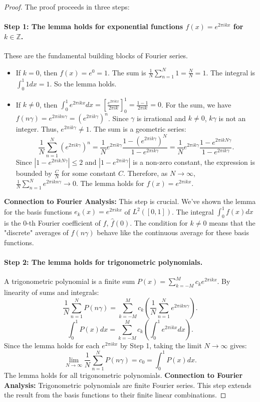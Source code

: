 \documentclass[12pt]{article}
\newcommand{\Z}{\mathbb{Z}}
\begin{document}
\begin{proof}
The proof proceeds in three steps:
\paragraph{Step 1: The lemma holds for exponential functions $f(x) = e^{2\pi i k x}$ for $k \in \Z$.}
These are the fundamental building blocks of Fourier series.
\begin{itemize}
    \item If $k=0$, then $f(x) = e^0 = 1$.
    The sum is $\frac{1}{N} \sum_{n=1}^N 1 = \frac{N}{N} = 1$.
    The integral is $\int_0^1 1 dx = 1$.
    So the lemma holds.
    \item If $k \neq 0$, then $\int_0^1 e^{2\pi i k x} dx = \left[ \frac{e^{2\pi i k x}}{2\pi i k} \right]_0^1 = \frac{1 - 1}{2\pi i k} = 0$.
    For the sum, we have $f(n\gamma) = e^{2\pi i k n\gamma} = (e^{2\pi i k \gamma})^n$.
    Since $\gamma$ is irrational and $k \neq 0$, $k\gamma$ is not an integer. Thus, $e^{2\pi i k \gamma} \neq 1$.
    The sum is a geometric series:
    $$ \frac{1}{N} \sum_{n=1}^N (e^{2\pi i k \gamma})^n = \frac{1}{N} e^{2\pi i k \gamma} \frac{1 - (e^{2\pi i k \gamma})^N}{1 - e^{2\pi i k \gamma}} = \frac{1}{N} e^{2\pi i k \gamma} \frac{1 - e^{2\pi i k N\gamma}}{1 - e^{2\pi i k \gamma}}. $$
    Since $|1 - e^{2\pi i k N\gamma}| \le 2$ and $|1 - e^{2\pi i k \gamma}|$ is a non-zero constant, the expression is bounded by $\frac{C}{N}$ for some constant $C$.
    Therefore, as $N \to \infty$, $\frac{1}{N} \sum_{n=1}^N e^{2\pi i k n\gamma} \to 0$.
    The lemma holds for $f(x) = e^{2\pi i k x}$.
\end{itemize}
\textbf{Connection to Fourier Analysis:} This step is crucial. We've shown the lemma for the basis functions $e_k(x) = e^{2\pi i k x}$ of $L^2([0,1])$. The integral $\int_0^1 f(x) dx$ is the $0$-th Fourier coefficient of $f$, $\hat{f}(0)$. The condition for $k \neq 0$ means that the "discrete" averages of $f(n\gamma)$ behave like the continuous average for these basis functions.

\paragraph{Step 2: The lemma holds for trigonometric polynomials.}
A trigonometric polynomial is a finite sum $P(x) = \sum_{k=-M}^M c_k e^{2\pi i k x}$.
By linearity of sums and integrals:
$$ \frac{1}{N} \sum_{n=1}^N P(n\gamma) = \sum_{k=-M}^M c_k \left( \frac{1}{N} \sum_{n=1}^N e^{2\pi i k n\gamma} \right). $$
$$ \int_0^1 P(x) dx = \sum_{k=-M}^M c_k \left( \int_0^1 e^{2\pi i k x} dx \right). $$
Since the lemma holds for each $e^{2\pi i k x}$ by Step 1, taking the limit $N \to \infty$ gives:
$$ \lim_{N\to\infty} \frac{1}{N} \sum_{n=1}^N P(n\gamma) = c_0 = \int_0^1 P(x) dx. $$
The lemma holds for all trigonometric polynomials.
\textbf{Connection to Fourier Analysis:} Trigonometric polynomials are finite Fourier series. This step extends the result from the basis functions to their finite linear combinations.


\end{proof}
\end{document}

